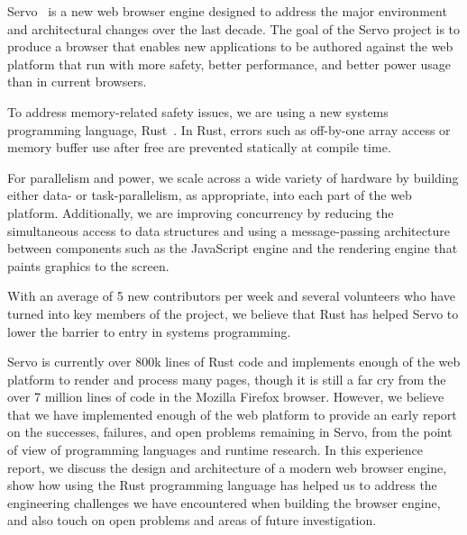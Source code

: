 Servo~\cite{SERVO} is a new web browser engine designed to address the major environment and 
architectural changes over the last decade.
The goal of the Servo project is to produce a browser that enables new applications to be authored
against the web platform that run with more safety, better performance, and better power usage
than in current browsers.

To address memory-related safety issues, we are using a new systems programming language,
Rust~\cite{RUST}.
In Rust, errors such as off-by-one array access or memory buffer use after free are
prevented statically at compile time.

For parallelism and power, we scale across a wide variety of hardware by building either data-
or task-parallelism, as appropriate, into each part of the web platform.
Additionally, we are improving concurrency by reducing the simultaneous access to data
structures and using a message-passing architecture between components such as the
JavaScript engine and the rendering engine that paints graphics to the screen.

With an average of 5 new contributors per week and several volunteers who have turned
into key members of the project, we believe that Rust has helped Servo to lower the
barrier to entry in systems programming.

Servo is currently over 800k lines of Rust code and implements enough of the web platform to render and
process many pages, though it is still a far cry from the over 7 million lines of code in
the Mozilla Firefox browser.
However, we believe that we have implemented enough of the web platform to provide an
early report on the successes, failures, and open problems remaining in Servo, from the
point of view of programming languages and runtime research.
In this experience report, we discuss the design and architecture of a modern web 
browser engine, show how using the Rust programming language has helped us to  address the
engineering challenges we have encountered when building the browser engine, and also touch on
open problems and areas of future investigation.

